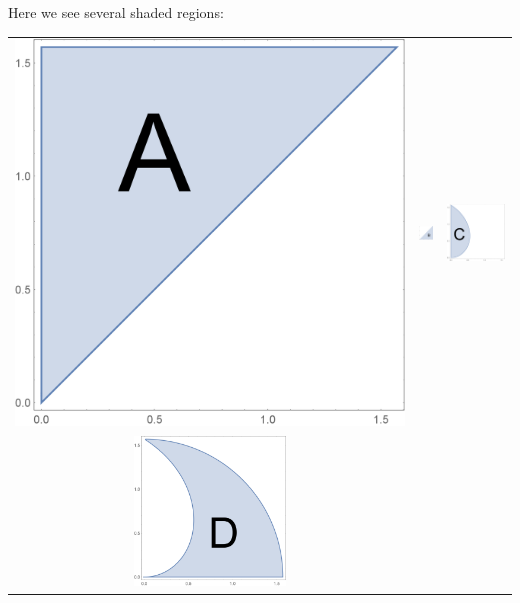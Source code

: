 \documentclass{ximera}
\begin{document}
\begin{exercise}
  Here we see several shaded regions:
  \begin{center}
    \begin{tabular}{ccc}
      \includegraphics{region2.png}            &
      \includegraphics[width=1cm]{region1.png} &
      \includegraphics[width=4cm]{region6.png} 
      \\
      \includegraphics[width=4cm]{region5.png} &

\end{tabular}
\end{center}
\end{exercise}
\end{document}
